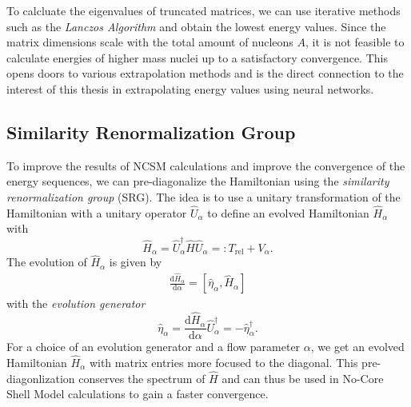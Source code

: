To calcluate the eigenvalues of truncated matrices, we can use iterative methods such as the \textit{Lanczos Algorithm} and obtain the lowest energy values. Since the matrix dimensions scale with the total amount of nucleons $A$, it is not feasible to calculate energies of higher mass nuclei up to a satisfactory convergence. This opens doors to various extrapolation methods and is the direct connection to the interest of this thesis in extrapolating energy values using neural networks.

\subsection{Similarity Renormalization Group}
To improve the results of NCSM calculations and improve the convergence of the energy sequences, we can pre-diagonalize the Hamiltonian using the \textit{similarity renormalization group} (SRG). The idea is to use a unitary transformation of the Hamiltonian with a unitary operator $\hat{U}_\alpha$ to define an evolved Hamiltonian $\hat{H}_\alpha$ with
\begin{equation}
  \hat{H}_\alpha = \hat{U}_\alpha^\dagger \hat{H} \hat{U}_\alpha =: T_\mathrm{rel} + V_\alpha.
\end{equation}
The evolution of $\hat{H}_\alpha$ is given by
\begin{align}
  \frac{\mathrm{d}\hat{H}_\alpha}{\mathrm{d}\alpha} = [\hat{\eta}_\alpha, \hat{H}_\alpha]
\end{align}
with the \textit{evolution generator}
\begin{equation}
  \hat{\eta}_\alpha = \frac{\mathrm{d}\hat{H}_\alpha}{\mathrm{d}\alpha} \hat{U}^\dagger_\alpha = -\hat{\eta}_\alpha^\dagger.
\end{equation}
For a choice of an evolution generator and a flow parameter $\alpha$, we get an evolved Hamiltonian $\hat{H}_\alpha$ with matrix entries more focused to the diagonal. This pre-diagonlization conserves the spectrum of $\hat{H}$ and can thus be used in No-Core Shell Model calculations to gain a faster convergence.
